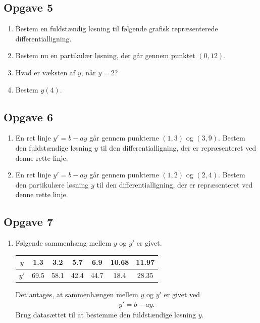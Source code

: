 \newpage 

\subsection*{Opgave 5}
\begin{enumerate}[label=\roman*)]
	\item Bestem en fuldstændig løsning til følgende grafisk repræsenterede differentialligning.
	\begin{center}
	\end{center}
	\item Bestem nu en partikulær løsning, der går gennem punktet $(0,12)$.
	\item Hvad er væksten af $y$, når $y=2$?
	\item Bestem $y(4)$.  
\end{enumerate}
\subsection*{Opgave 6}
\begin{enumerate}[label=\roman*)]
	\item En ret linje $y' = b-ay$ går gennem punkterne $(1,3)$ og $(3,9)$. Bestem den fuldstændige løsning $y$ til den
	differentialligning, der er repræsenteret ved denne rette linje.
	\item En ret linje $y' = b-ay$ går gennem punkterne $(1,2)$ og $(2,4)$. Bestem den partikulære løsning $y$ til den 
	differentialligning, der er repræsenteret ved denne rette linje.
\end{enumerate}

\subsection*{Opgave 7}
\begin{enumerate}[label=\roman*)]
	\item Følgende sammenhæng mellem $y$ og $y'$ er givet.
	\begin{center}
	\begin{tabular}{c|c|c|c|c|c|c}
		$y$ & 1.3 & 3.2 & 5.7 & 6.9 & 10.68 & 11.97\\
		\hline
		 $y'$ & 69.5 & 58.1 & 42.4 & 44.7 & 18.4 & 28.35
	\end{tabular}
	\end{center}
	Det antages, at sammenhængen mellem $y$ og $y'$ er givet ved
	\begin{align*}
		y' = b-ay.
	\end{align*}
	Brug datasættet til at bestemme den fuldstændige løsning $y$. 
\end{enumerate}

